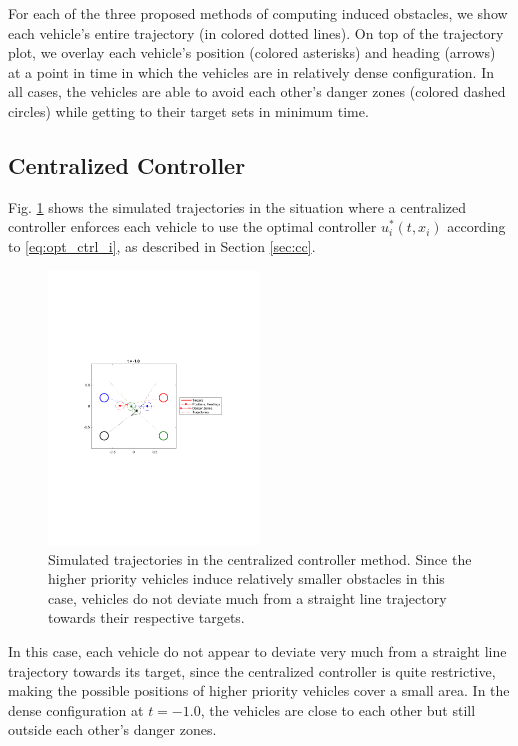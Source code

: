 For each of the three proposed methods of computing induced obstacles, we show each vehicle's entire trajectory (in colored dotted lines). On top of the trajectory plot, we overlay each vehicle's position (colored asterisks) and heading (arrows) at a point in time in which the vehicles are in relatively dense configuration. In all cases, the vehicles are able to avoid each other's danger zones (colored dashed circles) while getting to their target sets in minimum time.

\subsection{Centralized Controller}
Fig. \ref{fig:cc_traj} shows the simulated trajectories in the situation where a centralized controller enforces each vehicle to use the optimal controller $u^*_i(t, x_i)$ according to \eqref{eq:opt_ctrl_i}, as described in Section \ref{sec:cc}.

\begin{figure}
  \centering
  \includegraphics[width=0.5\textwidth]{"fig/cc_traj"}
  \caption{Simulated trajectories in the centralized controller method. Since the higher priority vehicles induce relatively smaller obstacles in this case, vehicles do not deviate much from a straight line trajectory towards their respective targets.}
  \label{fig:cc_traj}
\end{figure}

In this case, each vehicle do not appear to deviate very much from a straight line trajectory towards its target, since the centralized controller is quite restrictive, making the possible positions of higher priority vehicles cover a small area. In the dense configuration at $t=-1.0$, the vehicles are close to each other but still outside each other's danger zones.

